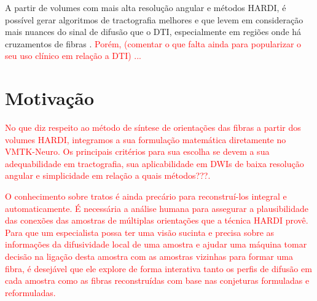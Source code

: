 \documentclass[
    12pt,                %
    oneside,            %
    a4paper,            %
    english,            %
    french,                %
    spanish,            %
    brazil                %
    ]{abntex2}
\begin{document}
A partir de volumes com mais alta resolução angular e métodos HARDI, é possível gerar algoritmos de tractografia melhores e que levem em consideração mais nuances do sinal de difusão que o DTI,   especialmente em regiões onde há cruzamentos de fibras \cite{fillard2011}. \textcolor{red}{Porém, (comentar o que falta ainda para popularizar o seu uso clínico em relação a DTI) ...}


\section{Motivação}
\label{ssec:motivation}


\textcolor{red}{No que diz respeito ao método de síntese de orientações das fibras a partir dos volumes HARDI, integramos a sua formulação matemática diretamente no VMTK-Neuro. Os principais critérios para sua escolha se devem a sua adequabilidade em tractografia, sua aplicabilidade em DWIs de baixa resolução angular e simplicidade em relação a quais métodos???.}


\textcolor{red}{O conhecimento sobre tratos é ainda precário para reconstruí-los integral e automaticamente. É necessária a análise humana para assegurar a plausibilidade das conexões das amostras de múltiplas orientações que a técnica HARDI provê. Para que um especialista possa ter uma visão sucinta e precisa sobre as informações da difusividade local de uma amostra e ajudar uma máquina tomar decisão na ligação desta amostra com as amostras vizinhas para formar uma fibra, é desejável que ele explore de forma interativa tanto os perfis de difusão em cada amostra como as fibras reconstruídas com base nas conjeturas formuladas e reformuladas.}
\end{document}
